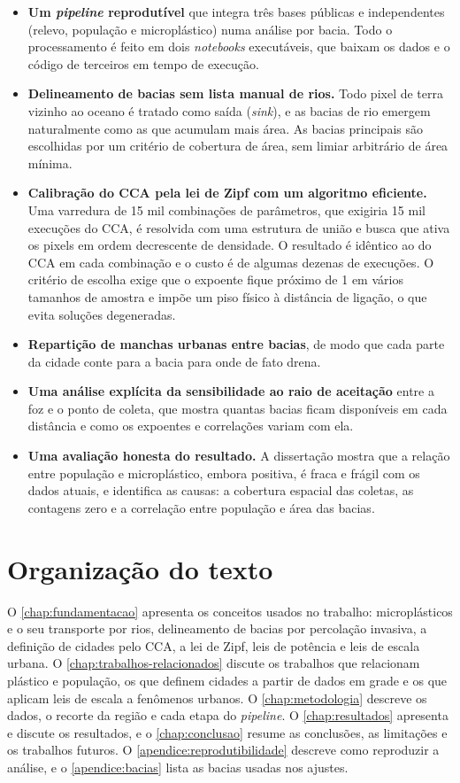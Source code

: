 \begin{itemize}
	\item \textbf{Um \textit{pipeline} reprodutível} que integra três bases públicas e independentes (relevo, população e microplástico) numa análise por bacia. Todo o processamento é feito em dois \textit{notebooks} executáveis, que baixam os dados e o código de terceiros em tempo de execução.
	\item \textbf{Delineamento de bacias sem lista manual de rios.} Todo pixel de terra vizinho ao oceano é tratado como saída (\textit{sink}), e as bacias de rio emergem naturalmente como as que acumulam mais área. As bacias principais são escolhidas por um critério de cobertura de área, sem limiar arbitrário de área mínima.
	\item \textbf{Calibração do CCA pela lei de Zipf com um algoritmo eficiente.} Uma varredura de 15 mil combinações de parâmetros, que exigiria 15 mil execuções do CCA, é resolvida com uma estrutura de união e busca que ativa os pixels em ordem decrescente de densidade. O resultado é idêntico ao do CCA em cada combinação e o custo é de algumas dezenas de execuções. O critério de escolha exige que o expoente fique próximo de 1 em vários tamanhos de amostra e impõe um piso físico à distância de ligação, o que evita soluções degeneradas.
	\item \textbf{Repartição de manchas urbanas entre bacias}, de modo que cada parte da cidade conte para a bacia para onde de fato drena.
	\item \textbf{Uma análise explícita da sensibilidade ao raio de aceitação} entre a foz e o ponto de coleta, que mostra quantas bacias ficam disponíveis em cada distância e como os expoentes e correlações variam com ela.
	\item \textbf{Uma avaliação honesta do resultado.} A dissertação mostra que a relação entre população e microplástico, embora positiva, é fraca e frágil com os dados atuais, e identifica as causas: a cobertura espacial das coletas, as contagens zero e a correlação entre população e área das bacias.
\end{itemize}

\section{Organização do texto}
\label{sec:organizacao}

O \autoref{chap:fundamentacao} apresenta os conceitos usados no trabalho: microplásticos e o seu transporte por rios, delineamento de bacias por percolação invasiva, a definição de cidades pelo CCA, a lei de Zipf, leis de potência e leis de escala urbana. O \autoref{chap:trabalhos-relacionados} discute os trabalhos que relacionam plástico e população, os que definem cidades a partir de dados em grade e os que aplicam leis de escala a fenômenos urbanos. O \autoref{chap:metodologia} descreve os dados, o recorte da região e cada etapa do \textit{pipeline}. O \autoref{chap:resultados} apresenta e discute os resultados, e o \autoref{chap:conclusao} resume as conclusões, as limitações e os trabalhos futuros. O \autoref{apendice:reprodutibilidade} descreve como reproduzir a análise, e o \autoref{apendice:bacias} lista as bacias usadas nos ajustes.

